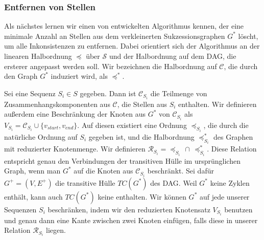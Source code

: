 \begin{center}
\end{center}

\subsubsection{Entfernen von Stellen}

Als nächstes lernen wir einen von \cite{pdc10} entwickelten Algorithmus kennen, der eine minimale Anzahl an Stellen aus dem verkleinerten Sukzessionsgraphen $G^{*}$ löscht, um alle Inkonsistenzen zu entfernen. Dabei orientiert sich der Algorithmus an der linearen Halbordnung $\preceq$ über $\mathcal{S}$ und der Halbordnung auf dem DAG, die ersterer angepasst werden soll. Wir bezeichnen die Halbordnung auf $\mathcal{C}$, die durch den Graph $G^{*}$ induziert wird, als $\preceq^{*}$.

Sei eine Sequenz $S_i \in S$ gegeben. Dann ist $\mathcal{C}_{S_i}$ die Teilmenge von Zusammenhangskomponenten aus $\mathcal{C}$, die Stellen aus $S_i$ enthalten. Wir definieren außerdem eine Beschränkung der Knoten aus $G^{*}$ von $\mathcal{C}_{S_i}$ als $V_{S_i} = \mathcal{C}_{S_i} \cup \{v_{start},v_{end}\}$. Auf diesen existiert eine Ordnung $\preceq_{S_i}$, die durch die natürliche Ordnung auf $S_i$ gegeben ist, und die Halbordnung $\preceq_{S_i}^{*}$ des Graphen mit reduzierter Knotenmenge. Wir definieren $\mathcal{R}_{S_i} = \preceq_{S_i}\, \cap\, \preceq_{S_i}^{*}$. Diese Relation entspricht genau den Verbindungen der transitiven Hülle im ursprünglichen Graph, wenn man $G^{*}$ auf die Knoten aus $\mathcal{C}_{S_i}$ beschränkt. Sei dafür $G^{+} = (V,E^{+})$ die transitive Hülle $TC(G^{*})$ des DAG. Weil $G^{*}$ keine Zyklen enthält, kann auch $TC(G^{*})$ keine enthalten. Wir können $G^{*}$ auf jede unserer Sequenzen $S_i$ beschränken, indem wir den reduzierten Knotensatz $V_{S_i}$ benutzen und genau dann eine Kante zwischen zwei Knoten einfügen, falls diese in unserer Relation $\mathcal{R}_{S_i}$ liegen.

